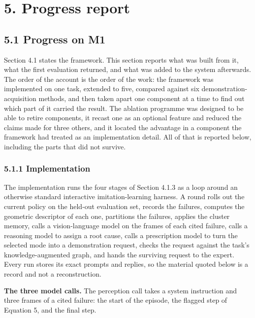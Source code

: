 \documentclass[
  11pt,
]{article}
\begin{document}
\hypertarget{progress-report}{%
\section{5. Progress report}\label{progress-report}}

\hypertarget{progress-on-m1}{%
\subsection{5.1 Progress on M1}\label{progress-on-m1}}

Section 4.1 states the framework. This section reports what was built
from it, what the first evaluation returned, and what was added to the
system afterwards. The order of the account is the order of the work:
the framework was implemented on one task, extended to five, compared
against six demonstration-acquisition methods, and then taken apart one
component at a time to find out which part of it carried the result. The
ablation programme was designed to be able to retire components, it
recast one as an optional feature and reduced the claims made for three
others, and it located the advantage in a component the framework had
treated as an implementation detail. All of that is reported below,
including the parts that did not survive.

\hypertarget{implementation}{%
\subsubsection{5.1.1 Implementation}\label{implementation}}

The implementation runs the four stages of Section 4.1.3 as a loop
around an otherwise standard interactive imitation-learning harness. A
round rolls out the current policy on the held-out evaluation set,
records the failures, computes the geometric descriptor of each one,
partitions the failures, applies the cluster memory, calls a
vision-language model on the frames of each cited failure, calls a
reasoning model to assign a root cause, calls a prescription model to
turn the selected mode into a demonstration request, checks the request
against the task's knowledge-augmented graph, and hands the surviving
request to the expert. Every run stores its exact prompts and replies,
so the material quoted below is a record and not a reconstruction.

\textbf{The three model calls.} The perception call takes a system
instruction and three frames of a cited failure: the start of the
episode, the flagged step of Equation 5, and the final step.
\end{document}
